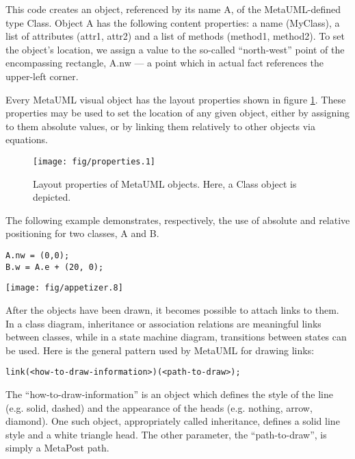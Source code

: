 \documentclass{article}
\newcommand{\code}{\ttfamily}
\begin{document}
This code creates an object, referenced by its name {\code A}, of the MetaUML-defined type {\code Class}. 
Object {\code A} has the following content properties: a name
({\code MyClass}), a list of attributes ({\code attr1}, {\code attr2})
and a list of methods ({\code method1}, {\code method2}). To set the object's location, we assign a value to the 
so-called ``north-west'' point of the encompassing rectangle, {\code A.nw} --- a point which in actual fact references 
the upper-left corner.

Every MetaUML visual object has the layout properties shown in figure \ref{fig:properties}. 
These properties may be used to set the location of any given object, either by assigning to them absolute values,
or by linking them relatively to other objects via equations.

\begin{figure}
\centering
\texttt{[image: fig/properties.1]}
\caption{Layout properties of MetaUML objects. Here, a {\code Class} object is depicted.}
\label{fig:properties}
\end{figure}
 
The following example demonstrates, respectively, the use of absolute and relative positioning for two classes, {\code A} and {\code  B}.

\begin{multicols}{2}
\begin{verbatim}
A.nw = (0,0);
B.w = A.e + (20, 0);
\end{verbatim}
\columnbreak
\texttt{[image: fig/appetizer.8]}
\end{multicols}

After the objects have been drawn, it becomes possible to attach links to them. In a class diagram, inheritance
or association relations are meaningful links between classes, while in a state machine diagram, transitions between 
states can be used. Here is the general pattern used by MetaUML for drawing links:

\begin{verbatim}
link(<how-to-draw-information>)(<path-to-draw>);
\end{verbatim}

The ``how-to-draw-information'' is an object which defines the style of the line (e.g. solid, dashed) and the appearance
of the heads (e.g. nothing, arrow, diamond). One such object, appropriately called {\code inheritance}, defines a solid
line style and a white triangle head. The other parameter, the ``path-to-draw'', is simply a MetaPost path.
\end{document}
